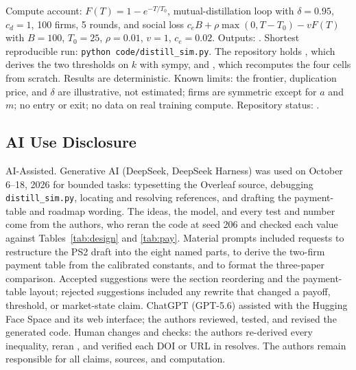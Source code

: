 Compute account: $F(T)=1-e^{-T/T_0}$, mutual-distillation loop with $\delta=0.95$, $c_d=1$, 100 firms, 5 rounds, and social loss $c_eB+\rho\max(0,T-T_0)-vF(T)$ with $B=100$, $T_0=25$, $\rho=0.01$, $v=1$, $c_e=0.02$. Outputs: . Shortest reproducible run: \texttt{python code/distill\_sim.py}. The repository holds , which derives the two thresholds on $k$ with sympy, and , which recomputes the four cells from scratch. Results are deterministic. Known limits: the frontier, duplication price, and $\delta$ are illustrative, not estimated; firms are symmetric except for $a$ and $m$; no entry or exit; no data on real training compute. Repository status: \GitHubLink.

\subsection{AI Use Disclosure}
AI-Assisted. Generative AI (DeepSeek, DeepSeek Harness) was used on October 6--18, 2026 for bounded tasks: typesetting the Overleaf source, debugging \texttt{distill\_sim.py}, locating and resolving references, and drafting the payment-table and roadmap wording. The ideas, the model, and every test and number come from the authors, who reran the code at seed 206 and checked each value against Tables~\ref{tab:design} and \ref{tab:pay}. Material prompts included requests to restructure the PS2 draft into the eight named parts, to derive the two-firm payment table from the calibrated constants, and to format the three-paper comparison. Accepted suggestions were the section reordering and the payment-table layout; rejected suggestions included any rewrite that changed a payoff, threshold, or market-state claim. ChatGPT (GPT-5.6) assisted with the Hugging Face Space and its web interface; the authors reviewed, tested, and revised the generated code. Human changes and checks: the authors re-derived every inequality, reran , and verified each DOI or URL in  resolves. The authors remain responsible for all claims, sources, and computation.

